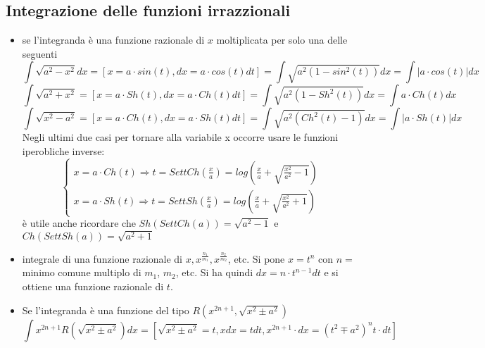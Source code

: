 \documentclass[a4paper, 9pt]{report}
\begin{document}
\subsection*{Integrazione delle funzioni irrazzionali}
\begin{itemize}
    \item se l'integranda è una funzione razionale di $x$ moltiplicata per solo una delle seguenti
    \[
        \int \sqrt{a^2-x^2} dx = [x=a \cdot  sin(t), dx =a \cdot  cos(t)dt] = \int \sqrt{a^2(1-sin^2(t))}dx = \int|a \cdot  cos(t)|dx
    \]
    \[
        \int \sqrt{a^2 + x^2} = [x=a \cdot  Sh(t), dx =a \cdot  Ch(t)dt] = \int \sqrt{a^2(1-Sh^2(t))}dx = \int a \cdot  Ch(t)dx
    \]
    \[
        \int \sqrt{x^2 -a^2} = [x=a \cdot  Ch(t), dx =a \cdot Sh(t)dt] = \int \sqrt{a^2(Ch^2(t)-1)}dx = \int|a \cdot Sh(t)|dx
    \]
    Negli ultimi due casi per tornare alla variabile x occorre usare le funzioni iperobliche inverse:
    \[
        \begin{cases}
            x = a \cdot  Ch(t) \Rightarrow t = SettCh(\frac{x}{a}) = log\left(\frac{x}{a}+\sqrt{\frac{x^2}{a^2}-1}\right)\\
            x= a \cdot Sh(t) \Rightarrow t = SettSh\left(\frac{x}{a}\right) = log\left(\frac{x}{a}+\sqrt{\frac{x^2}{a^2}+1}\right)
        \end{cases}
    \]
    è utile anche ricordare che $Sh(SettCh(a))= \sqrt{a^2-1}$ e $Ch(SettSh(a))=\sqrt{a^2+1}$
    \item integrale di una funzione razionale di $x, x^{\frac{n_1}{m_1}}, x^{\frac{n_2}{m_2}}$, etc. \newline
    Si pone $x = t^n$ con $n=$ minimo comune multiplo di $m_1$, $m_2$, etc. Si ha quindi $dx = n \cdot  t^{n-1} dt$ e si ottiene una funzione razionale di $t$.
    \item Se l'integranda è una funzione del tipo $R(x^{2n+1}, \sqrt{x^2 \pm a^2})$
    \[
        \int x^{2n+1}R(\sqrt{x^2 \pm a^2})dx = [\sqrt{x^2 \pm a^2} = t, xdx= tdt, x^{2n+1} \cdot dx = (t^2 \mp a^2)^n t \cdot  dt]
    \]
\end{itemize}
\end{document}

